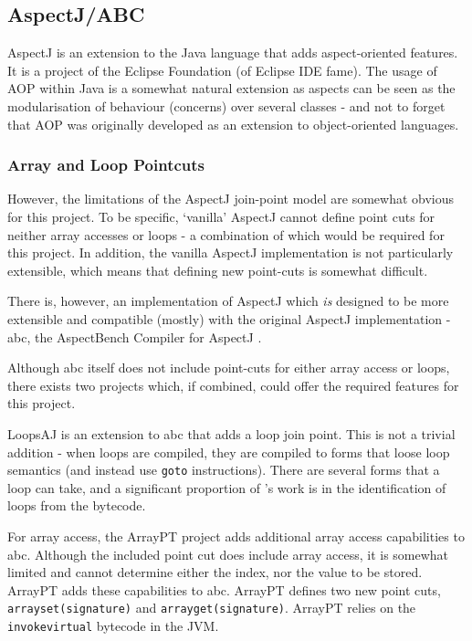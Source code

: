 	\subsection{AspectJ/ABC} \label{sec:instrumentation/aop/aspectj}
	AspectJ \citep{Kiczales2001} is an extension to the Java language that adds aspect-oriented features. It is a project of the Eclipse Foundation (of Eclipse IDE fame). The usage of AOP within Java is a somewhat natural extension as aspects can be seen as the modularisation of behaviour (concerns) over several classes - and not to forget that AOP was originally developed as an extension to object-oriented languages.
		
		\subsubsection{Array and Loop Pointcuts} \label{sec:instrumentation/aop/aspectj/arrayloop}
		However, the limitations of the AspectJ join-point model are somewhat obvious for this project. To be specific, `vanilla' AspectJ cannot define point cuts for neither array accesses or loops - a combination of which would be required for this project. In addition, the vanilla AspectJ implementation is not particularly extensible, which means that defining new point-cuts is somewhat difficult.
		
		There is, however, an implementation of AspectJ which \emph{is} designed to be more extensible and compatible (mostly) with the original AspectJ implementation - abc, the AspectBench Compiler for AspectJ \citep{Allan2005}.
		
		Although abc itself does not include point-cuts for either array access or loops, there exists two projects which, if combined, could offer the required features for this project.
		
		LoopsAJ \citep{Harbulot2005} is an extension to abc that adds a loop join point. This is not a trivial addition - when loops are compiled, they are compiled to forms that loose loop semantics (and instead use \texttt{goto} instructions). There are several forms that a loop can take, and a significant proportion of \citeauthor{Harbulot2005}'s work is in the identification of loops from the bytecode.
				
		For array access, the ArrayPT project \citep{Chen2007} adds additional array access capabilities to abc. Although the included point cut does include array access, it is somewhat limited and cannot determine either the index, nor the value to be stored. ArrayPT adds these capabilities to abc. ArrayPT defines two new point cuts, \texttt{arrayset(signature)} and \texttt{arrayget(signature)}. ArrayPT relies on the \texttt{invokevirtual} bytecode in the JVM.
		
